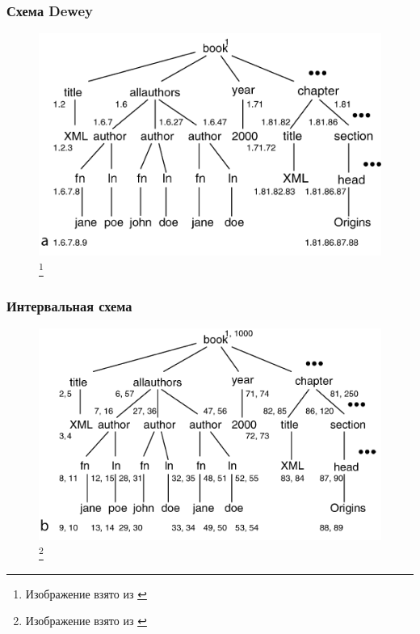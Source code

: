 \documentclass{beamer}
\begin{document}
\begin{frame}
\frametitle{Схема Dewey}
\begin{figure}[htb]
\includegraphics[width=\textwidth,height=0.65\textheight,keepaspectratio]{xml-dewey.png} 
\footnote{\tiny{Изображение взято из \cite{Luna2009}}}
\end{figure}    
\end{frame}

\begin{frame}
\frametitle{Интервальная схема}
\begin{figure}[htb]
\includegraphics[width=\textwidth,height=0.65\textheight,keepaspectratio]{xml-interval.png} 
\footnote{\tiny{Изображение взято из \cite{Luna2009}}}
\end{figure}    
\end{frame}
\end{document}
